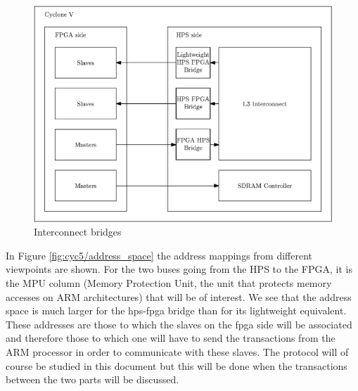 \begin{figure}[H]
    \centering
    \includegraphics[scale=0.6]{Chapter1-Hardware/res/cycv_interconnect}
    \caption{Interconnect bridges}
    \label{fig:cyc5/interconnect}
\end{figure}

In Figure \ref{fig:cyc5/address_space} the address mappings from different viewpoints are shown. For 
the two buses going from the HPS to the FPGA, it is the MPU column (Memory Protection Unit, the unit 
that protects memory accesses on ARM architectures) that will be of interest. We see that the address 
space is much larger for the hps-fpga
bridge than for its lightweight equivalent. These addresses 
are those to which the slaves on the fpga side will be associated and therefore those to which one
will have to send the transactions from the ARM processor in order to communicate with these slaves. 
The protocol will of course be studied in this document but this will be done when the transactions 
between the two parts will be discussed.

